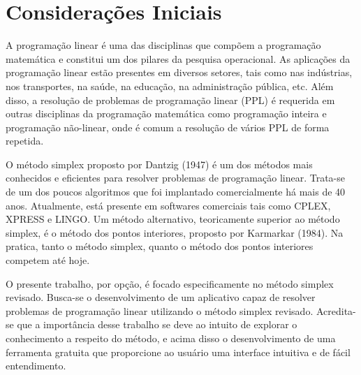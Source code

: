 \section{Considerações Iniciais}
A programação linear é uma das disciplinas que compõem a programação matemática e constitui um dos pilares da pesquisa operacional. As aplicações da programação linear estão presentes em diversos setores, tais como nas indústrias, nos transportes, na saúde, na educação, na administração pública, etc. Além disso, a resolução de problemas de programação linear (PPL) é requerida em outras disciplinas da programação matemática como programação inteira e programação não-linear, onde é comum a resolução de vários PPL de forma repetida.

O método simplex proposto por Dantzig (1947) é um dos métodos mais conhecidos e eficientes para resolver problemas de programação linear. Trata-se de um dos poucos algoritmos que foi implantado comercialmente há mais de 40 anos. Atualmente, está presente em softwares comerciais tais como CPLEX, XPRESS e LINGO. Um método alternativo, teoricamente superior ao método simplex, é o método dos pontos interiores, proposto por Karmarkar (1984). Na pratica, tanto o método simplex, quanto o método dos pontos interiores competem até hoje.  

O presente trabalho, por opção, é focado especificamente no método simplex revisado. Busca-se o desenvolvimento de um aplicativo capaz de resolver problemas de programação linear utilizando o método simplex revisado. Acredita-se que a importância desse trabalho se deve ao intuito de explorar o conhecimento a respeito do método, e acima disso o desenvolvimento de uma ferramenta gratuita que proporcione ao usuário uma interface intuitiva e de fácil entendimento.
